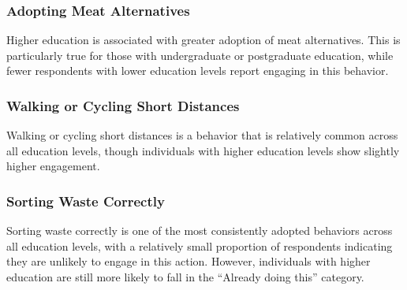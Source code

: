 \documentclass[
  letterpaper,
  DIV=11,
  numbers=noendperiod]{scrartcl}
\begin{document}
\subsubsection{Adopting Meat
Alternatives}\label{adopting-meat-alternatives}

Higher education is associated with greater adoption of meat
alternatives. This is particularly true for those with undergraduate or
postgraduate education, while fewer respondents with lower education
levels report engaging in this behavior.

\subsubsection{Walking or Cycling Short
Distances}\label{walking-or-cycling-short-distances}

Walking or cycling short distances is a behavior that is relatively
common across all education levels, though individuals with higher
education levels show slightly higher engagement.

\subsubsection{Sorting Waste Correctly}\label{sorting-waste-correctly}

Sorting waste correctly is one of the most consistently adopted
behaviors across all education levels, with a relatively small
proportion of respondents indicating they are unlikely to engage in this
action. However, individuals with higher education are still more likely
to fall in the ``Already doing this'' category.

\begin{figure}


\caption{\label{fig-seven}}

\end{figure}%
\end{document}
